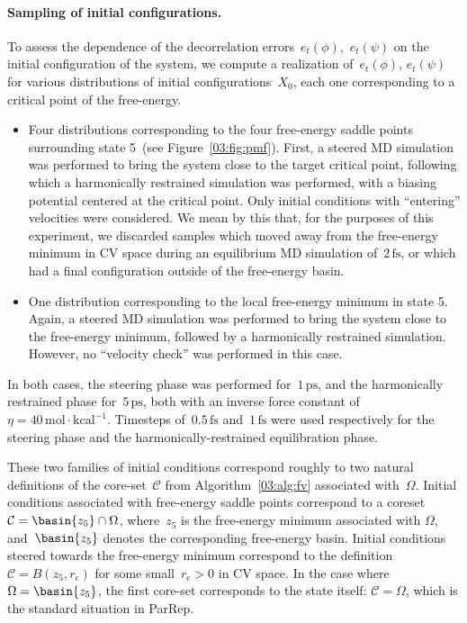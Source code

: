 \paragraph{Sampling of initial configurations.}
To assess the dependence of the decorrelation errors~$e_t(\phi)$,~$e_t(\psi)$ on the initial configuration of the system, we compute a realization of~$e_t(\phi),\,e_t(\psi)$ for various distributions of initial configurations~$X_0$, each one corresponding to a critical point of the free-energy.
\begin{itemize}
    \item{Four distributions corresponding to the four free-energy saddle points surrounding state 5~(see Figure~\ref{03:fig:pmf}). First, a steered MD simulation was performed to bring the system close to the target critical point, following which a harmonically restrained simulation was performed, with a biasing potential centered at the critical point. Only initial conditions with ``entering'' velocities were considered. We mean by this that, for the purposes of this experiment, we discarded samples which moved away from the free-energy minimum in CV space during an equilibrium MD simulation of~$2\,\mathrm{fs}$, or which had a final configuration outside of the free-energy basin.}
    \item{One distribution corresponding to the local free-energy minimum in state 5. Again, a steered MD simulation was performed to bring the system close to the free-energy minimum, followed by a harmonically restrained simulation. However, no ``velocity check'' was performed in this case.}
\end{itemize}
In both cases, the steering phase was performed for~$1\,\mathrm{ps}$, and the harmonically restrained phase for~$5\,\mathrm{ps}$, both with an inverse force constant of~$\eta=40\,\mathrm{mol}\cdot\mathrm{kcal}^{-1}$.
Timesteps of~$0.5\,\mathrm{fs}$ and~$1\,\mathrm{fs}$ were used respectively for the steering phase and the harmonically-restrained equilibration phase.

These two families of initial conditions correspond roughly to two natural definitions of the core-set~$\mathcal C$ from Algorithm~\ref{03:alg:fv} associated with~$\Omega$. Initial conditions associated with free-energy saddle points correspond to a coreset~$\mathcal C=\basin{z_5}\cap\Omega$, where~$z_5$ is the free-energy minimum associated with $\Omega$, and~$\basin{z_5}$  denotes the corresponding free-energy basin. Initial conditions steered towards the free-energy minimum correspond to the definition~$\mathcal C = B(z_5,r_{\mathrm{c}})$ for some small~$r_{\mathrm{c}}>0$ in CV space.
In the case where~$\Omega =\basin{z_5}$, the first core-set corresponds to the state itself: $\mathcal C=\Omega$, which is the standard situation in ParRep.

